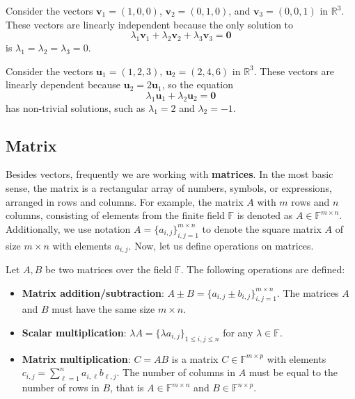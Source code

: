 \documentclass[../lecture-notes-148x210.tex]{subfiles}
\begin{document}
\begin{example}
    Consider the vectors $\mathbf{v}_1 = (1, 0, 0)$, $\mathbf{v}_2 = (0, 1, 0)$, and $\mathbf{v}_3 = (0, 0, 1)$ in $\mathbb{R}^3$. These vectors are linearly independent because the only solution to
    \begin{equation*}
        \lambda_1 \mathbf{v}_1 + \lambda_2 \mathbf{v}_2 + \lambda_3 \mathbf{v}_3 = \mathbf{0}
    \end{equation*}
    is $\lambda_1 = \lambda_2 = \lambda_3 = 0$.
\end{example}

\begin{example}
    Consider the vectors $\mathbf{u}_1 = (1, 2, 3)$, $\mathbf{u}_2 = (2, 4, 6)$ in $\mathbb{R}^3$. These vectors are linearly dependent because $\mathbf{u}_2 = 2\mathbf{u}_1$, so the equation
    \begin{equation*}
        \lambda_1 \mathbf{u}_1 + \lambda_2 \mathbf{u}_2 = \mathbf{0}
    \end{equation*}
    has non-trivial solutions, such as $\lambda_1 = 2$ and $\lambda_2 = -1$.
\end{example}

\subsection{Matrix}

Besides vectors, frequently we are working with \textbf{matrices}. In the most
basic sense, the matrix is a rectangular array of numbers, symbols, or
expressions, arranged in rows and columns. For example, the matrix $A$ with $m$
rows and $n$ columns, consisting of elements from the finite field $\mathbb{F}$
is denoted as $A \in \mathbb{F}^{m \times n}$. Additionally, we use notation $A
= \{a_{i,j}\}_{i,j=1}^{m \times n}$ to denote the square matrix $A$ of size $m
\times n$ with elements $a_{i,j}$. Now, let us define operations on matrices.

\begin{definition}
    Let $A,B$ be two matrices over the field $\mathbb{F}$. The following operations are defined:
    \begin{itemize}
        \item \textbf{Matrix addition/subtraction}: $A \pm B = \{a_{i,j} \pm b_{i,j}\}_{i,j=1}^{m \times n}$. The matrices $A$ and $B$ must have the same size $m \times n$.
        \item \textbf{Scalar multiplication}: $\lambda A = \{\lambda a_{i,j}\}_{1\leq i,j \leq n}$ for any $\lambda \in \mathbb{F}$.
        \item \textbf{Matrix multiplication}: $C = AB$ is a matrix $C \in \mathbb{F}^{m \times p}$ with elements $c_{i,j} = \sum_{\ell=1}^{n} a_{i,\ell}b_{\ell,j}$. The number of columns in $A$ must be equal to the number of rows in $B$, that is $A \in \mathbb{F}^{m \times n}$ and $B \in \mathbb{F}^{n \times p}$.
    \end{itemize}
\end{definition}
\end{document}

